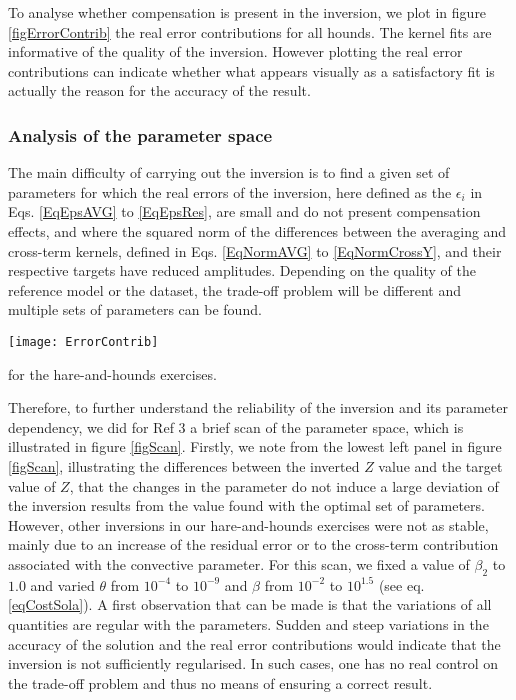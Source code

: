 \documentclass[a4paper,fleqn,usenatbib]{mnras}
\begin{document}
To analyse whether compensation is present in the inversion, we plot in figure \ref{figErrorContrib} the real error contributions for all hounds. The kernel fits are informative of the quality of the inversion. However plotting the real error contributions can indicate whether what appears visually as a satisfactory fit is actually the reason for the accuracy of the result. 

\subsubsection{Analysis of the parameter space}
The main difficulty of carrying out the inversion is to find a given set of parameters for which the real errors of the inversion, here defined as the $\epsilon_{i}$ in Eqs. \ref{EqEpsAVG} to \ref{EqEpsRes}, are small and do not present compensation effects, and where the squared norm of the differences between the averaging and cross-term kernels, defined in Eqs. \ref{EqNormAVG} to \ref{EqNormCrossY}, and their respective targets have reduced amplitudes. Depending on the quality of the reference model or the dataset, the trade-off problem will be different and multiple sets of parameters can be found. 
 \begin{figure*}
	\centering
		\texttt{[image: ErrorContrib]}
	\caption{Error contributions, denoted $\epsilon_{Avg}$,$\epsilon_{CrossY}$,$\epsilon_{Cross,A}$,$\epsilon_{Res}$} for the hare-and-hounds exercises. 
		\label{figErrorContrib}
\end{figure*} 
Therefore, to further understand the reliability of the inversion and its parameter dependency, we did for Ref $3$ a brief scan of the parameter space, which is illustrated in figure \ref{figScan}. Firstly, we note from the lowest left panel in figure \ref{figScan}, illustrating the differences between the inverted $Z$ value and the target value of $Z$, that the changes in the parameter do not induce a large deviation of the inversion results from the value found with the optimal set of parameters. However, other inversions in our hare-and-hounds exercises were not as stable, mainly due to an increase of the residual error or to the cross-term contribution associated with the convective parameter. For this scan, we fixed a value of $\beta_{2}$ to $1.0$ and varied $\theta$ from $10^{-4}$ to $10^{-9}$ and $\beta$ from $10^{-2}$ to $10^{1.5}$ (see eq. \ref{eqCostSola}). A first observation that can be made is that the variations of all quantities are regular with the parameters. Sudden and steep variations in the accuracy of the solution and the real error contributions would indicate that the inversion is not sufficiently regularised. In such cases, one has no real control on the trade-off problem and thus no means of ensuring a correct result. 
\end{document}
